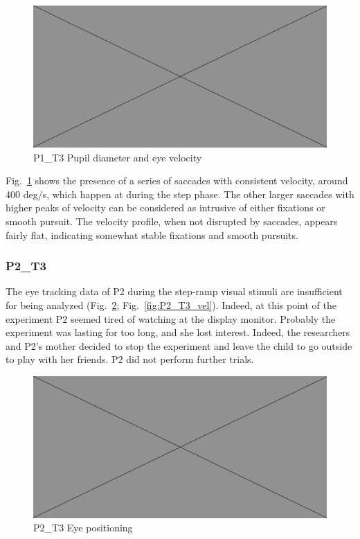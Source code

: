 \begin{figure}[h]
  \centering
  \includegraphics[width=.5\textwidth]{figures/placeholderImg.jpg}
  \caption[P1\_T3 pupil velocity]{P1\_T3 Pupil diameter and eye velocity}
  \label{fig:P1_T3_vel}
\end{figure}

Fig.~\ref{fig:P1_T3_vel} shows the presence of a series of saccades with consistent velocity, around 400 deg/s, which happen at during the step phase. The other larger saccades with higher peaks of velocity can be considered as intrusive of either fixations or smooth pursuit. The velocity profile, when not disrupted by saccades, appears fairly flat, indicating somewhat stable fixations and smooth pursuits. 



\subsubsection{P2\_T3}
\label{sec:P2_T3}

The eye tracking data of P2 during the step-ramp visual stimuli are insufficient for being analyzed (Fig.~\ref{fig:P2_T3_pos}; Fig.~\ref{fig:P2_T3_vel}). Indeed, at this point of the experiment P2 seemed tired of watching at the display monitor. Probably the experiment was lasting for too long, and she lost interest. Indeed, the researchers and P2’s mother decided to stop the experiment and leave the child to go outside to play with her friends. P2 did not perform further trials.

\begin{figure}[h]
  \centering
  \includegraphics[width=.5\textwidth]{figures/placeholderImg.jpg}
  \caption[P2\_T3 Eye positioning]{P2\_T3 Eye positioning}
  \label{fig:P2_T3_pos}
\end{figure}

